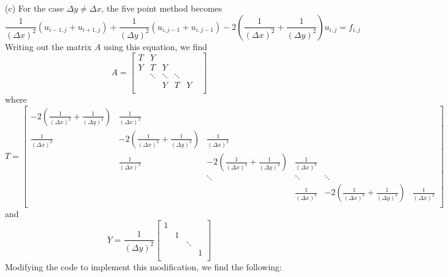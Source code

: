 \documentclass{article}
\begin{document}
(c) For the case $\Delta y \neq \Delta x$, the five point method becomes
\[\frac{1}{(\Delta x)^2}(u_{i-1,j} + u_{i+1,j}) + \frac{1}{(\Delta y)^2}(u_{i,j-1} + u_{i,j-1}) - 2\left(\frac{1}{(\Delta x)^2} + \frac{1}{(\Delta y)^2}\right)u_{i,j} = f_{i,j}\]
Writing out the matrix $A$ using this equation, we find
\[A = \begin{bmatrix}
    T & Y & & & & \\
    Y & T & Y & & \\
     & \ddots & \ddots & \ddots & \\
     & & Y & T & Y\\
     
\end{bmatrix}\]
where
\[T = \begin{bmatrix}
    -2\left(\frac{1}{(\Delta x)^2} + \frac{1}{(\Delta y)^2}\right) & \frac{1}{(\Delta x)^2} & & &\\
    \frac{1}{(\Delta x)^2} & -2\left(\frac{1}{(\Delta x)^2} + \frac{1}{(\Delta y)^2}\right) & \frac{1}{(\Delta x)^2} & & \\
    & \frac{1}{(\Delta x)^2} & -2\left(\frac{1}{(\Delta x)^2} + \frac{1}{(\Delta y)^2}\right) & \frac{1}{(\Delta x)^2} & \\
    & & \ddots & \ddots & \ddots & \\
    & & & \frac{1}{(\Delta x)^2} & -2\left(\frac{1}{(\Delta x)^2} + \frac{1}{(\Delta y)^2}\right) & \frac{1}{(\Delta x)^2}\\
    
\end{bmatrix}\]
and
\[Y = \frac{1}{(\Delta y)^2}\begin{bmatrix}
    1 & & & \\
     & 1 & & \\
     & & \ddots & \\
     & & & 1\\
\end{bmatrix}\]
Modifying the code to implement this modification, we find the following:
\end{document}
